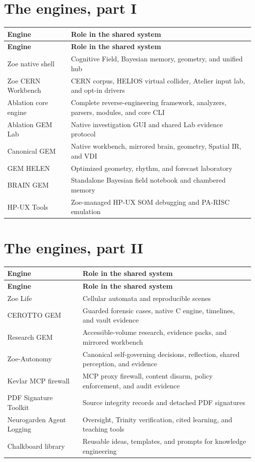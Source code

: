 \documentclass[11pt]{article}
\begin{document}
\clearpage
\section{The engines, part I}

\begin{longtable}{p{}p{}}
\toprule
\textbf{Engine} & \textbf{Role in the shared system}\\
\midrule
\endfirsthead
\toprule
\textbf{Engine} & \textbf{Role in the shared system}\\
\midrule
\endhead
Zoe native shell & Cognitive Field, Bayesian memory, geometry, and unified hub\\
Zoe CERN Workbench & CERN corpus, HELIOS virtual collider, Atelier input lab, and opt-in drivers\\
Ablation core engine & Complete reverse-engineering framework, analyzers, parsers, modules, and core CLI\\
Ablation GEM Lab & Native investigation GUI and shared Lab evidence protocol\\
Canonical GEM & Native workbench, mirrored brain, geometry, Spatial IR, and VDI\\
GEM HELEN & Optimized geometry, rhythm, and forecast laboratory\\
BRAIN GEM & Standalone Bayesian field notebook and chambered memory\\
HP-UX Tools & Zoe-managed HP-UX SOM debugging and PA-RISC emulation\\
\bottomrule
\end{longtable}

\section{The engines, part II}

\begin{longtable}{p{}p{}}
\toprule
\textbf{Engine} & \textbf{Role in the shared system}\\
\midrule
\endfirsthead
\toprule
\textbf{Engine} & \textbf{Role in the shared system}\\
\midrule
\endhead
Zoe Life & Cellular automata and reproducible scenes\\
CEROTTO GEM & Guarded forensic cases, native C engine, timelines, and vault evidence\\
Research GEM & Accessible-volume research, evidence packs, and mirrored workbench\\
Zoe-Autonomy & Canonical self-governing decisions, reflection, shared perception, and evidence\\
Kevlar MCP firewall & MCP proxy firewall, content disarm, policy enforcement, and audit evidence\\
PDF Signature Toolkit & Source integrity records and detached PDF signatures\\
Neurogarden Agent Logging & Oversight, Trinity verification, cited learning, and teaching tools\\
Chalkboard library & Reusable ideas, templates, and prompts for knowledge engineering\\
\bottomrule
\end{longtable}
\end{document}
